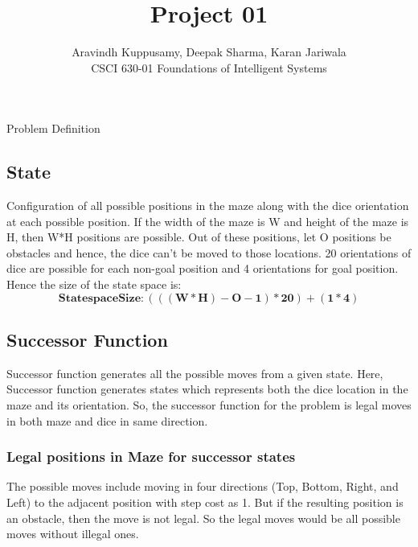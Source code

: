 \documentclass[12pt]{article}
\begin{document}
 
 
 
\title{Project 01}%
\author{Aravindh Kuppusamy, Deepak Sharma, Karan Jariwala\\ %
CSCI 630-01 Foundations of Intelligent Systems} %
 
\maketitle
 
\begin{section}{Problem Definition} 
\subsection{State}
Configuration of all possible positions in the maze along with the dice orientation at each possible position. If the width of the maze is W and height of the maze is H, then W*H positions are possible. Out of these positions, let O positions be obstacles and hence, the dice can't be moved to those locations. 20 orientations of dice are possible for each non-goal position and 4 orientations for goal position. Hence the size of the state space is:
\[
 {\mathbf{State space Size: (((W*H)-O-1)*20) + (1*4)}} 
\]

\subsection{Successor Function}
Successor function generates all the possible moves from a given state. Here, Successor function generates states which represents both the dice location in the maze and its orientation. So, the successor function for the problem is legal moves in both maze and dice in same direction.
\subsubsection{Legal positions in Maze for successor states}
The possible moves include moving in four directions (Top, Bottom, Right, and Left) to the adjacent position with step cost as 1. But if the resulting position is an obstacle, then the move is not legal. So the legal moves would be all possible moves without illegal ones.

\end{section}
\end{document}
